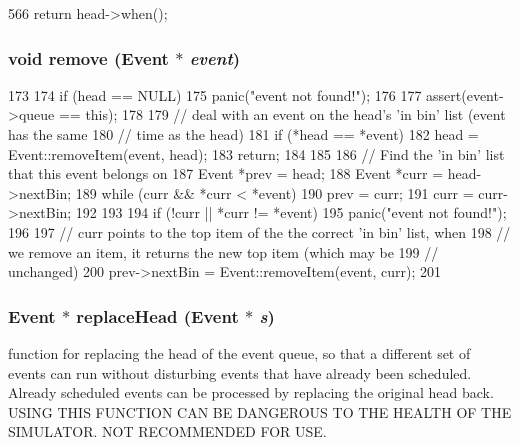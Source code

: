 \begin{DoxyCode}
566 { return head->when(); }
\end{DoxyCode}
\hypertarget{classEventQueue_a3f3ea68ae4a3b85263c9e223efcce2f6}{
\subsubsection[{remove}]{\setlength{\rightskip}{0pt plus 5cm}void remove (Event $\ast$ {\em event})}}
\label{classEventQueue_a3f3ea68ae4a3b85263c9e223efcce2f6}



\begin{DoxyCode}
173 {
174     if (head == NULL)
175         panic("event not found!");
176 
177     assert(event->queue == this);
178 
179     // deal with an event on the head's 'in bin' list (event has the same
180     // time as the head)
181     if (*head == *event) {
182         head = Event::removeItem(event, head);
183         return;
184     }
185 
186     // Find the 'in bin' list that this event belongs on
187     Event *prev = head;
188     Event *curr = head->nextBin;
189     while (curr && *curr < *event) {
190         prev = curr;
191         curr = curr->nextBin;
192     }
193 
194     if (!curr || *curr != *event)
195         panic("event not found!");
196 
197     // curr points to the top item of the the correct 'in bin' list, when
198     // we remove an item, it returns the new top item (which may be
199     // unchanged)
200     prev->nextBin = Event::removeItem(event, curr);
201 }
\end{DoxyCode}
\hypertarget{classEventQueue_a1c4b36385e86f178f625f84d95cb6778}{
\subsubsection[{replaceHead}]{\setlength{\rightskip}{0pt plus 5cm}Event $\ast$ replaceHead (Event $\ast$ {\em s})}}
\label{classEventQueue_a1c4b36385e86f178f625f84d95cb6778}
function for replacing the head of the event queue, so that a different set of events can run without disturbing events that have already been scheduled. Already scheduled events can be processed by replacing the original head back. USING THIS FUNCTION CAN BE DANGEROUS TO THE HEALTH OF THE SIMULATOR. NOT RECOMMENDED FOR USE. 


